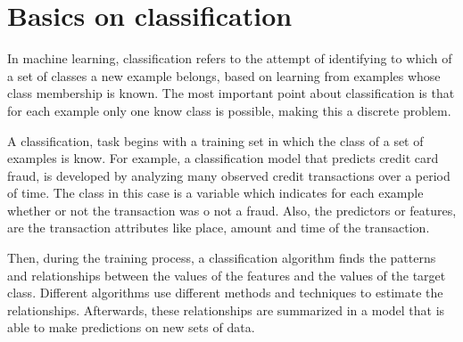 % 


\section{Basics on classification}
In machine learning, classification refers to the attempt of identifying to which of a set of 
classes a new example belongs, based on learning from examples whose class membership is known. 
The most important point about classification is that for each example only one know class is 
possible, making this a discrete problem. 

A classification, task begins with a training set in which the class of a set of examples is know. 
For example, a classification model that predicts credit card fraud, is developed by analyzing 
many observed credit transactions over a period of time. The class in this case is a variable which 
indicates for each example whether or not the transaction was o not a fraud. Also, the predictors 
or features, are the transaction attributes like place, amount and time of the transaction.

Then, during the training process, a classification algorithm finds the patterns and relationships 
between the values of the features and the values of the target class. Different algorithms use 
different methods and techniques to estimate the relationships. Afterwards, these relationships are 
summarized in a model that is able to make predictions on new sets of data.

